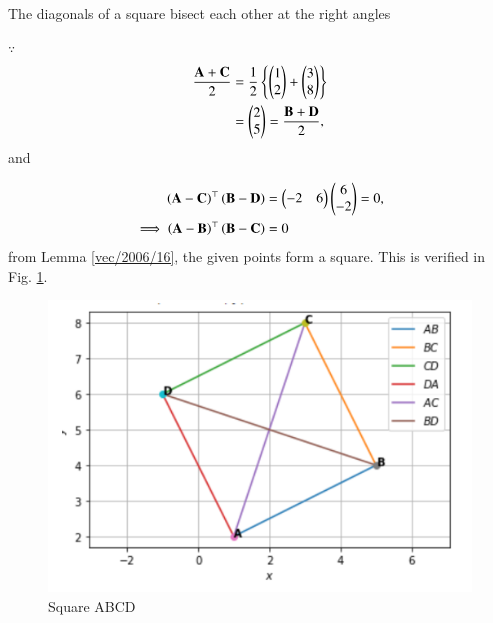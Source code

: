 


\begin{lemma}
  The diagonals of a square bisect each other at the right angles
  \label{vec/2006/16}
     
\end{lemma}
$\because$
\begin{align}
  \frac{\mathbf {A} + \mathbf {C}}{2}&=\frac{1}{2}\left\{\begin{pmatrix}1\\2\end{pmatrix}+\begin{pmatrix}3\\8\end{pmatrix}\right\} \\ &= \begin{pmatrix}2\\5\end{pmatrix} = \frac{\mathbf {B} + \mathbf {D}}{2},
  \end{align}
  and 
  
\begin{align}
  \left(\mathbf{A}-\mathbf{C}\right)^\top\left(\mathbf{B}-\mathbf{D}\right)&=\begin{pmatrix}-2 & 6\end{pmatrix}\begin{pmatrix}6\\-2\end{pmatrix}= 0,
  \\
  \implies  \left(\mathbf{A}-\mathbf{B}\right)^\top\left(\mathbf{B}-\mathbf{C}\right)&=0
\end{align}
from Lemma \ref{vec/2006/16}, the given points form a square.  This is verified in 
Fig. \ref{vec/2006/16/fig:Square ABCD}.
%
\begin{figure}[h!]
  \centering
\includegraphics[width=\columnwidth]{vectors/solutions/2006/16/Python- Square Image.png}
  \caption{Square ABCD}
  \label{vec/2006/16/fig:Square ABCD}
\end{figure}


